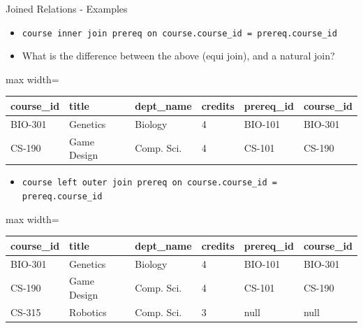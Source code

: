 \documentclass[aspectratio=169, xcolor=dvipsnames]{beamer}
\begin{document}
\begin{frame}[fragile]{Joined Relations - Examples}
    \begin{itemize}
        \item \texttt{course inner join prereq on course.course\_id = prereq.course\_id}
        \item What is the difference between the above (equi join), and a natural join?
    \end{itemize}
    \begin{center}
        \begin{adjustbox}{max width=\textwidth}
        \begin{tabular}{|l|l|l|l|l|l|}
        \hline
        \textbf{course\_id} & \textbf{title} & \textbf{dept\_name} & \textbf{credits} & \textbf{prereq\_id} & \textbf{course\_id} \\ \hline
        BIO-301 & Genetics & Biology & 4 & BIO-101 & BIO-301 \\ \hline
        CS-190 & Game Design & Comp. Sci. & 4 & CS-101 & CS-190 \\ \hline
        \end{tabular}
        \end{adjustbox}
    \end{center}

    \vspace{0.5em}
    \begin{itemize}
        \item \texttt{course left outer join prereq on course.course\_id = prereq.course\_id}
    \end{itemize}
    \begin{center}
        \begin{adjustbox}{max width=\textwidth}
        \begin{tabular}{|l|l|l|l|l|l|}
        \hline
        \textbf{course\_id} & \textbf{title} & \textbf{dept\_name} & \textbf{credits} & \textbf{prereq\_id} & \textbf{course\_id} \\ \hline
        BIO-301 & Genetics & Biology & 4 & BIO-101 & BIO-301 \\ \hline
        CS-190 & Game Design & Comp. Sci. & 4 & CS-101 & CS-190 \\ \hline
        CS-315 & Robotics & Comp. Sci. & 3 & null & null \\ \hline
        \end{tabular}
        \end{adjustbox}
    \end{center}
\end{frame}
\end{document}
